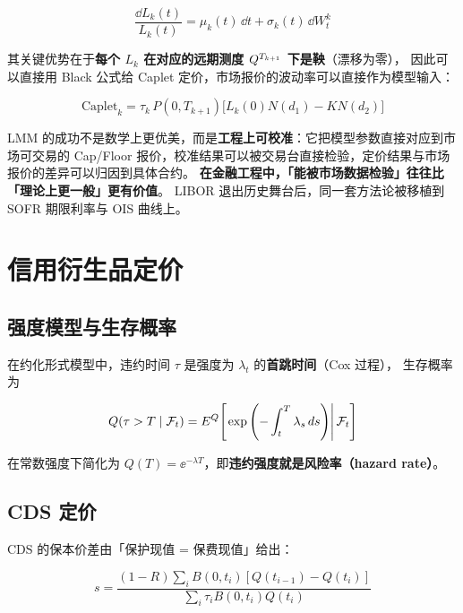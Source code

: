 \begin{equation}
  \frac{\dd L_k(t)}{L_k(t)} = \mu_k(t)\,\dd t+\sigma_k(t)\,\dd W_t^{k}
  \label{eq:06-lmm}
\end{equation}

其关键优势在于\textbf{每个 $L_k$ 在对应的远期测度 $Q^{T_{k+1}}$ 下是鞅}（漂移为零），
因此可以直接用 Black 公式给 Caplet 定价，市场报价的波动率可以直接作为模型输入：

\begin{equation}
  \text{Caplet}_k = \tau_k\,P(0,T_{k+1})\Big[L_k(0)N(d_1)-KN(d_2)\Big]
  \label{eq:06-caplet}
\end{equation}

\begin{appbox}[市场模型为什么赢了]
LMM 的成功不是数学上更优美，而是\textbf{工程上可校准}：它把模型参数直接对应到市场可交易的
Cap/Floor 报价，校准结果可以被交易台直接检验，定价结果与市场报价的差异可以归因到具体合约。
\textbf{在金融工程中，「能被市场数据检验」往往比「理论上更一般」更有价值}。
LIBOR 退出历史舞台后，同一套方法论被移植到 SOFR 期限利率与 OIS 曲线上。
\end{appbox}

\section{信用衍生品定价}

\subsection{强度模型与生存概率}

在约化形式模型中，违约时间 $\tau$ 是强度为 $\lambda_t$ 的\textbf{首跳时间}（Cox 过程），
生存概率为

\begin{equation}
  Q(\tau>T\mid\mathcal{F}_t) = E^{Q}\!\left[\left.\exp\left(-\int_t^{T}\lambda_s\,d s\right)\right|\mathcal{F}_t\right]
  \label{eq:06-survival}
\end{equation}

在常数强度下简化为 $Q(T)=\ee^{-\lambda T}$，即\textbf{违约强度就是风险率（hazard rate）}。

\subsection{CDS 定价}

CDS 的保本价差由「保护现值 = 保费现值」给出：

\begin{equation}
  s = \frac{(1-R)\sum_{i}B(0,t_i)\left[Q(t_{i-1})-Q(t_i)\right]}
           {\sum_{i}\tau_i B(0,t_i)Q(t_i)}
  \label{eq:06-cds}
\end{equation}

